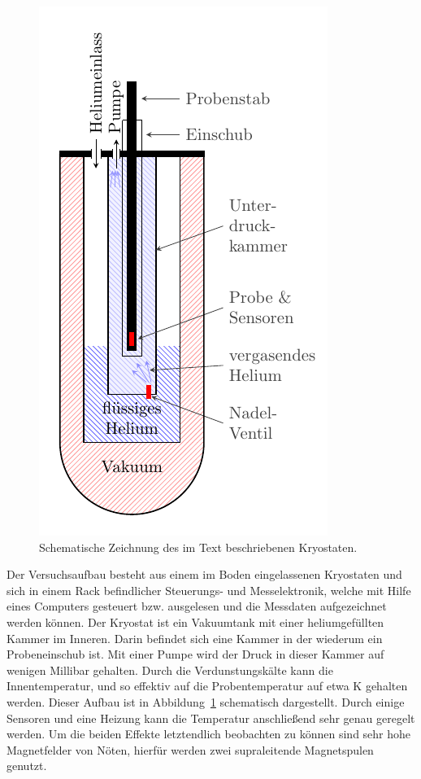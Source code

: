 \documentclass[12pt,a4paper]{article}
\begin{document}
	\begin{figure}
		\centering
		\includegraphics[scale=1]{graphs/aufbau/tank.pdf}
		\caption[Schematischer Aufbau des Kryostaten]{Schematische Zeichnung des im Text beschriebenen Kryostaten.}
		\label{fig:kryo}
	\end{figure}
	Der Versuchsaufbau besteht aus einem im Boden eingelassenen Kryostaten und sich in einem Rack befindlicher Steuerungs- und Messelektronik, welche mit Hilfe eines Computers gesteuert bzw. ausgelesen und die Messdaten aufgezeichnet werden können. Der Kryostat ist ein Vakuumtank mit einer heliumgefüllten Kammer im Inneren. Darin befindet sich eine Kammer in der wiederum ein Probeneinschub ist. Mit einer Pumpe wird der Druck in dieser Kammer auf wenigen Millibar gehalten. Durch die Verdunstungskälte kann die Innentemperatur, und so effektiv auf die Probentemperatur auf etwa \unit[1,5]{K} gehalten werden. Dieser Aufbau ist in Abbildung~\ref{fig:kryo} schematisch dargestellt. Durch einige Sensoren und eine Heizung kann die Temperatur anschließend sehr genau geregelt werden. Um die beiden Effekte letztendlich beobachten zu können sind sehr hohe Magnetfelder von Nöten, hierfür werden zwei supraleitende Magnetspulen genutzt.\\
	
\end{document}
